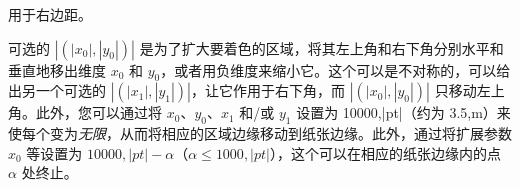 用于右边距。
% 


可选的 $|(|x_0|,|y_0|)|$ 是为了扩大要着色的区域，将其左上角和右下角分别水平和垂直地移出维度 $x_0$ 和 $y_0$，或者用负维度来缩小它。这个{\em\Uidx\bgext}可以是不对称的，可以给出另一个可选的 $|(|x_1|,|y_1|)|$，让它作用于右下角，而 $|(|x_0|,|y_0|)|$ 只移动左上角。此外，您可以通过将 $x_0$、$y_0$、$x_1$ 和/或 $y_1$ 设置为 10000,|pt|（约为 3.5,m）来使每个\bgext{}变为{\em 无限}，从而将相应的区域边缘移动到纸张边缘。此外，通过将扩展参数 $x_0$ 等设置为 $10000,|pt|-\alpha$（$\alpha\leq1000,|pt|$），这个{\em\Uidx\bginfext{}}可以在相应的纸张边缘内的点 $\alpha$ 处终止。

